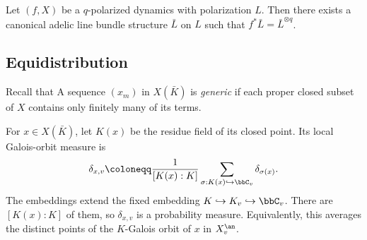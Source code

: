 \begin{definition}[label=\labelNFM{def:canonical-height}, status=draft, tag=0000000]
	Let $(f,X)$ be a $q$-polarized dynamics with polarization $L$.
	Then there exists a canonical adelic line bundle structure $\bar{L}$ on $L$ such that $f^*\bar{L} = \bar{L}^{\otimes q}$.
\end{definition}

















































\subsection[status=draft,tag=0000000,label=\labelNFM{subsec:equidistirbution}]{Equidistribution}

Recall that A sequence $(x_m)$ in $X(\bar K)$ is \emph{generic} if each proper closed subset of $X$ contains only finitely many of its terms.

For $x \in X(\bar K)$, let $K(x)$ be the residue field of its closed point.
Its local Galois-orbit measure is
\[ \delta_{x,v} \coloneqq \frac{1}{[K(x):K]}\sum_{\sigma:K(x)\hookrightarrow\bbC_v}\delta_{\sigma(x)}. \]
The embeddings extend the fixed embedding $K \hookrightarrow K_v \hookrightarrow \bbC_v$.
There are $[K(x):K]$ of them, so $\delta_{x,v}$ is a probability measure.
Equivalently, this averages the distinct points of the $K$-Galois orbit of $x$ in $X_v^\an$.

